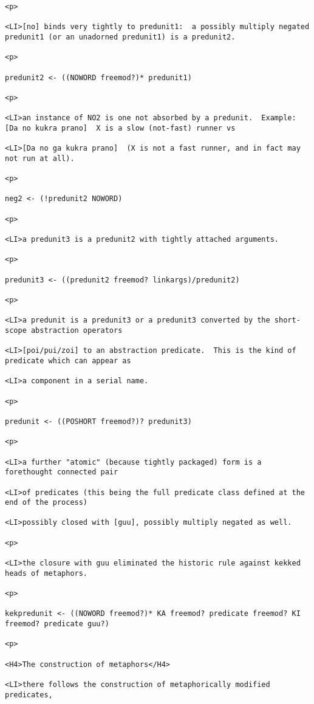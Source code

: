 \documentclass[12pt]{article}
\begin{document}
\begin{lstlisting}
<p>

<LI>[no] binds very tightly to predunit1:  a possibly multiply negated predunit1 (or an unadorned predunit1) is a predunit2.

<p>

predunit2 <- ((NOWORD freemod?)* predunit1)

<p>

<LI>an instance of NO2 is one not absorbed by a predunit.  Example:  [Da no kukra prano]  X is a slow (not-fast) runner vs

<LI>[Da no ga kukra prano]  (X is not a fast runner, and in fact may not run at all).

<p>

neg2 <- (!predunit2 NOWORD)

<p>

<LI>a predunit3 is a predunit2 with tightly attached arguments.

<p>

predunit3 <- ((predunit2 freemod? linkargs)/predunit2)

<p>

<LI>a predunit is a predunit3 or a predunit3 converted by the short-scope abstraction operators

<LI>[poi/pui/zoi] to an abstraction predicate.  This is the kind of predicate which can appear as

<LI>a component in a serial name.

<p>

predunit <- ((POSHORT freemod?)? predunit3)

<p>

<LI>a further "atomic" (because tightly packaged) form is a forethought connected pair

<LI>of predicates (this being the full predicate class defined at the end of the process)

<LI>possibly closed with [guu], possibly multiply negated as well.

<p>

<LI>the closure with guu eliminated the historic rule against kekked heads of metaphors.

<p>

kekpredunit <- ((NOWORD freemod?)* KA freemod? predicate freemod? KI freemod? predicate guu?)

<p>

<H4>The construction of metaphors</H4>

<LI>there follows the construction of metaphorically modified predicates,


\end{lstlisting}
\end{document}
